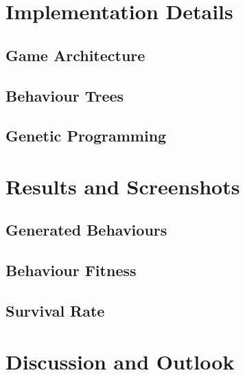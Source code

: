 \documentclass[a4paper, twocolumn]{article}
\begin{document}
	
    \section{Implementation Details} \label{sec:implementation_details}



        \subsection{Game Architecture} \label{sec:game_architecture}


        \subsection{Behaviour Trees} \label{sec:behaviour_trees_implementation}


        \subsection{Genetic Programming} \label{sec:genetic_programming_implementation}



    \section{Results and Screenshots} \label{sec:results_and_screenshots}



        \subsection{Generated Behaviours} \label{sec:generated_behaviours}



        \subsection{Behaviour Fitness} \label{sec:behaviour_fitness}



        \subsection{Survival Rate} \label{sec:survival_rate}



    \section{Discussion and Outlook} \label{sec:discussion_and_outlook}
\end{document}
